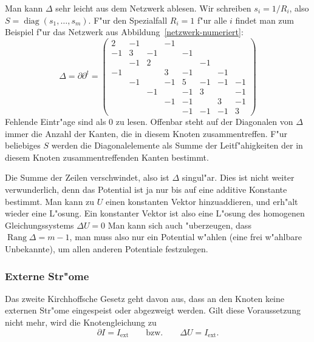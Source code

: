 Man kann $\Delta$ sehr leicht aus dem Netzwerk ablesen. Wir schreiben
$s_i=1/R_i$, also $S=\operatorname{diag}(s_1,\dots,s_m)$.
F"ur den Spezialfall
$R_i=1$ f"ur alle $i$ findet man zum Beispiel f"ur das Netzwerk
aus Abbildung~\ref{netzwerk-numeriert}:
\begin{equation}
\Delta
=
\partial \partial^t
=
\begin{pmatrix}
   2& -1&   & -1&   &   &   &   \\
  -1&  3& -1&   & -1&   &   &   \\
    & -1&  2&   &   & -1&   &   \\
  -1&   &   &  3& -1&   & -1&   \\
    & -1&   & -1&  5& -1& -1& -1\\
    &   & -1&   & -1&  3&   & -1\\
    &   &   & -1& -1&   &  3& -1\\
    &   &   &   & -1& -1& -1&  3
\end{pmatrix}
\label{samplelaplace}
\end{equation}
Fehlende Eintr"age sind als 0 zu lesen. Offenbar steht auf der Diagonalen
von $\Delta$ immer die Anzahl der Kanten, die in diesem 
Knoten zusammentreffen. F"ur beliebiges $S$ werden die Diagonalelemente
als Summe der Leitf"ahigkeiten der in diesem Knoten zusammentreffenden
Kanten bestimmt.

Die Summe der Zeilen verschwindet, also ist $\Delta$ singul"ar.
Dies ist nicht weiter verwunderlich, denn das Potential ist ja nur
bis auf eine additive Konstante bestimmt. Man kann zu $U$ einen
konstanten Vektor hinzuaddieren, und erh"alt wieder eine L"osung.
Ein konstanter Vektor ist also eine L"osung des homogenen 
Gleichungssystems $\Delta U=0$
Man kann sich auch "uberzeugen, dass $\operatorname{Rang}\Delta = m-1$,
man muss also nur ein Potential w"ahlen (eine frei w"ahlbare Unbekannte),
um allen anderen Potentiale festzulegen.

\subsubsection{Externe Str"ome}
Das zweite Kirchhoffsche Gesetz geht davon aus, dass an den
Knoten keine externen Str"ome eingespeist oder abgezweigt werden.
Gilt diese Voraussetzung nicht mehr, wird die Knotengleichung zu
\begin{equation}
\partial I=I_{\text{ext}}
\qquad
\text{bzw.}
\qquad
\Delta U=I_{\text{ext}}.
\label{externestroeme}
\end{equation}

